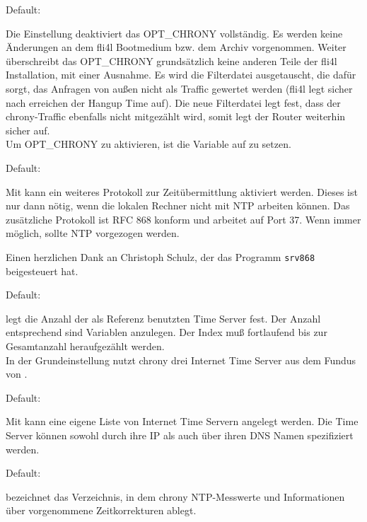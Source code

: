 \begin{description}


  Default: 

  Die Einstellung  deaktiviert das OPT\_CHRONY vollständig. Es werden
  keine Änderungen an dem fli4l Bootmedium bzw. dem Archiv 
  vorgenommen. Weiter überschreibt das OPT\_CHRONY grundsätzlich keine anderen
  Teile der fli4l Installation, mit einer Ausnahme. Es wird die Filterdatei
  ausgetauscht, die dafür sorgt, das Anfragen von außen nicht als Traffic
  gewertet werden (fli4l legt sicher nach erreichen der Hangup Time auf). Die
  neue Filterdatei legt fest, dass der chrony-Traffic ebenfalls nicht mitgezählt
  wird, somit legt der Router weiterhin sicher auf.\\
  Um OPT\_CHRONY zu aktivieren, ist die Variable  auf 
   zu setzen. 

  

  Default: 

  Mit  kann ein weiteres Protokoll zur Zeitübermittlung
  aktiviert werden. Dieses ist nur dann nötig, wenn die lokalen Rechner nicht
  mit NTP arbeiten können. Das zusätzliche Protokoll ist RFC 868 konform und
  arbeitet auf Port 37. Wenn immer möglich, sollte NTP vorgezogen werden.

  Einen herzlichen Dank an Christoph Schulz, der das Programm \texttt{srv868}
  beigesteuert hat.



  Default: 

   legt die Anzahl der als Referenz benutzten Time
  Server fest.  Der Anzahl entsprechend sind 
  Variablen anzulegen. Der Index  muß fortlaufend bis zur Gesamtanzahl
  heraufgezählt werden.\\
  In der Grundeinstellung nutzt chrony drei Internet Time Server aus dem
  Fundus von .
  


  Default: 
  
  Mit  kann eine eigene Liste von Internet Time
  Servern angelegt werden. Die Time Server können sowohl durch ihre IP als
  auch über ihren DNS Namen spezifiziert werden.


  Default: 

   bezeichnet das Verzeichnis, in dem chrony NTP-Messwerte
  und Informationen über vorgenommene Zeitkorrekturen ablegt.

\end{description}
  
